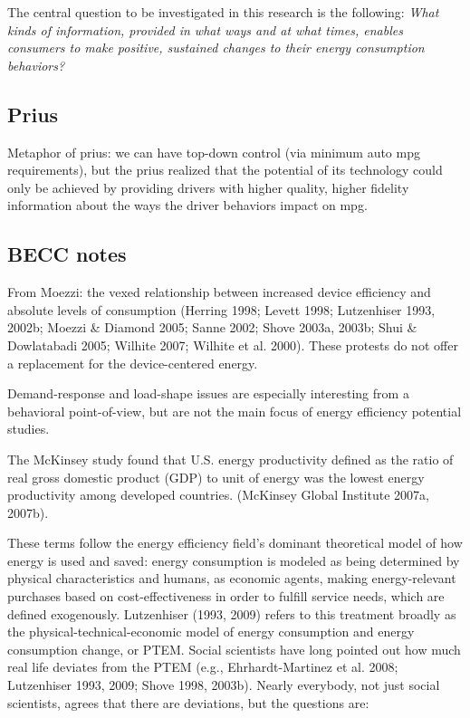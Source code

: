 The central question to be investigated in this
research is the following: {\em What kinds of information, provided in what ways and at what
times, enables consumers to make positive, sustained changes to their
energy consumption behaviors?}

\subsection{Prius}

Metaphor of prius:  we can have top-down control (via minimum auto mpg
requirements), but the prius realized that the potential of its technology
could only be achieved by providing drivers with higher quality, higher
fidelity information about the ways the driver behaviors impact on mpg.

\subsection {BECC notes}

From Moezzi: the vexed relationship between increased device efficiency and
absolute levels of consumption (Herring 1998; Levett 1998; Lutzenhiser
1993, 2002b; Moezzi & Diamond 2005; Sanne 2002; Shove 2003a, 2003b; Shui &
Dowlatabadi 2005; Wilhite 2007; Wilhite et al. 2000).  These protests do
not offer a replacement for the device-centered energy.

Demand-response and load-shape issues are especially interesting from a
behavioral point-of-view, but are not the main focus of energy efficiency
potential studies.

The McKinsey study found that U.S. energy productivity defined as the ratio
of real gross domestic product (GDP) to unit of energy was the lowest
energy productivity among developed countries.  (McKinsey Global Institute
2007a, 2007b).

These terms follow the energy efficiency field's dominant theoretical model
of how energy is used and saved: energy consumption is modeled as being
determined by physical characteristics and humans, as economic agents,
making energy-relevant purchases based on cost-effectiveness in order to
fulfill service needs, which are defined exogenously. Lutzenhiser (1993,
2009) refers to this treatment broadly as the physical-technical-economic
model of energy consumption and energy consumption change, or PTEM. Social
scientists have long pointed out how much real life deviates from the PTEM
(e.g., Ehrhardt-Martinez et al. 2008; Lutzenhiser 1993, 2009; Shove 1998,
2003b). Nearly everybody, not just social scientists, agrees that there are
deviations, but the questions are:

